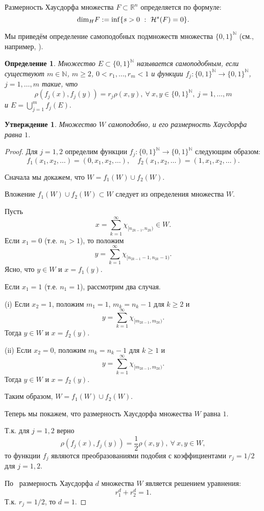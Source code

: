 \documentclass[12pt]{article}
\newtheorem{prop}[thm]{Утверждение}
\newtheorem{dfn}[thm]{Определение}
\def\N{{\mathbb{N}}}
\begin{document}
Размерность Хаусдорфа множества  $F\subset \mathbb R^n$ определяется по формуле:
$${\rm dim}_H F := \inf\{ s > 0 \ : \ \mathcal H^s(F)=0\}.$$



 Мы приведём определение самоподобных подмножеств множества $\{0,1\}^\N$ (см., например, \cite{falconer1997techniques}).

\begin{dfn}
Множество $E\subset\{0,1\}^\N$ называется самоподобным, если существуют $m\in\N$, $m\geqslant2$, $0< r_1, \dots, r_m<1$ и функции $f_j : \{0,1\}^\N \to \{0,1\}^\N$, $j=1,\dots, m$ такие, что
$$\rho(f_j(x), f_j(y)) = r_j \rho(x,y), \ \forall \ x,y \in \{0,1\}^\N, \ j=1,\dots, m$$
и $E=\bigcup_{j=1}^m f_j(E).$
\end{dfn}


\begin{prop}
Множество $W$ самоподобно, и его размерность Хаусдорфа равна $1$.
\end{prop}

\begin{proof}
Для $j=1,2$ определим функции $f_j : \{0,1\}^\N \to \{0,1\}^\N$ следующим образом:
$$f_1(x_1, x_2, \dots)=(0, x_1, x_2, \dots), \quad f_2(x_1, x_2, \dots)=(1, x_1, x_2, \dots).$$

Сначала мы докажем, что $W=f_1(W)\cup f_2(W).$

Вложение $f_1(W)\cup f_2(W) \subset W$ следует из определения множества $W$.

Пусть
$$x=\sum_{k=1}^\infty \chi_{[n_{2k-1},n_{2k})}\in W.$$
 Если $x_1=0$ (т.е. $n_1>1$), то положим
 $$y=\sum_{k=1}^\infty \chi_{[n_{2k-1}-1,n_{2k}-1)}.$$
 Ясно, что $y\in W$ и $x=f_1(y)$.

 Если $x_1=1$ (т.е. $n_1=1$), рассмотрим два случая.

 (i) Если $x_2=1$, положим $m_1=1$, $m_k=n_k-1$ для $k\geqslant2$ и
 $$y=\sum_{k=1}^\infty \chi_{[m_{2k-1},m_{2k})}.$$
 Тогда $y\in W$ и $x=f_2(y)$.

 (ii) Если $x_2=0$, положим $m_k=n_k-1$ для $k\geqslant1$ и
 $$y=\sum_{k=1}^\infty \chi_{[m_{2k-1},m_{2k})}.$$
 Тогда $y\in W$ и $x=f_2(y)$.

 Таким образом, $W=f_1(W)\cup f_2(W).$

 Теперь мы покажем, что размерность Хаусдорфа множества $W$ равна $1$.

Т.к. для $j=1,2$ верно
 $$\rho(f_j(x),f_j(y))=\frac12\rho(x,y), \ \forall \ x, y \in W,$$
 то функции $f_j$ являются преобразованиями подобия с коэффициентами $r_j=1/2$ для $j=1,2$.


По~\cite[Теорема 9.3]{Edgar} размерность Хаусдорфа $d$ множества $W$ является решением уравнения:
$$ r_1^d+r_2^d=1.$$
Т.к. $r_j=1/2$, то
$d=1.$
\end{proof}
\end{document}
